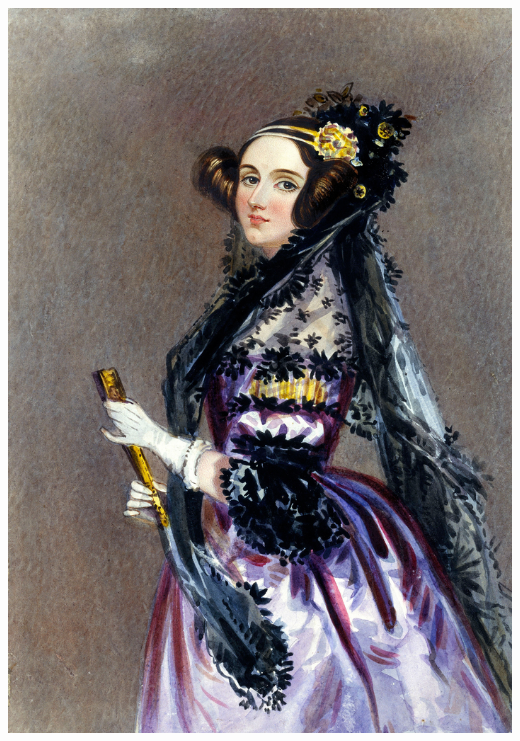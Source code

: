 \documentclass[a4paper,11pt,twoside]{article}
\newcommand{\mail}[1]{{\href{mailto:#1}{#1}}}
\begin{document}
\begin{titlepage}
\begin{center}
 

\begin{center}
\includegraphics[width = 5 cm]{./pic/lovelace.jpg} %
\end{center}
%
%
%
%
%
%






\end{center}
\end{titlepage}
\end{document}
